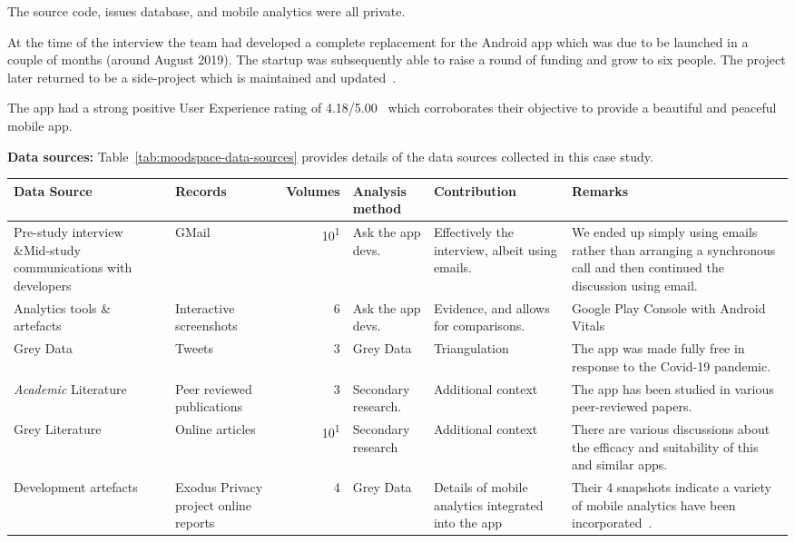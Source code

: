 The source code, issues database, and mobile analytics were all private.

At the time of the interview the team had developed a complete replacement for the Android app which was due to be launched in a couple of months (around August 2019). The startup was subsequently able to raise a round of funding and grow to six people. The project later returned to be a side-project which is maintained and updated~.

The app had a strong positive User Experience rating of 4.18/5.00~ which corroborates their objective to provide a beautiful and peaceful mobile app.

\textbf{Data sources:} Table~\ref{tab:moodspace-data-sources} provides details of the data sources collected in this case study.

\begin{table*}
    \centering
    \footnotesize
    \tabcolsep=0.12cm
    \begin{tabular}{p{2.3cm}>{\raggedright}p{2.1cm}r>{\raggedright}p{2.4cm}>{\raggedright}p{2.8cm}>{\raggedright\arraybackslash}p{3.2cm}}
        Data Source & Records & Volumes & Analysis method & Contribution & Remarks \\
        \toprule
         Pre-study interview \&Mid-study communications with developers & GMail & 10\textsuperscript{1} & Ask the app devs. & Effectively the interview, albeit using emails.  & We ended up simply using emails rather than arranging a synchronous call and then continued the discussion using email.  \\
         Analytics tools \& artefacts &Interactive screenshots & 6 & Ask the app devs. & Evidence, and allows for comparisons. & Google Play Console with Android Vitals \\
         Grey Data &Tweets & 3 & Grey Data & Triangulation & The app was made fully free in response to the Covid-19 pandemic. \\
         \textit{Academic} Literature  &Peer reviewed publications & 3 & Secondary research. & Additional context & The app has been studied in various peer-reviewed papers.\footnotemark \\
         Grey Literature &Online articles & 10\textsuperscript{1} & Secondary research & Additional context & There are various discussions about the efficacy and suitability of this and similar apps. \\
         Development artefacts\footnotemark & Exodus Privacy project online reports & 4 & Grey Data & Details of mobile analytics integrated into the app & Their 4 snapshots indicate a variety of mobile analytics have been incorporated~\footnotemark. \\
         \bottomrule
    \end{tabular}
    \caption{Moodspace: data sources}
    \label{tab:moodspace-data-sources}
\end{table*}

